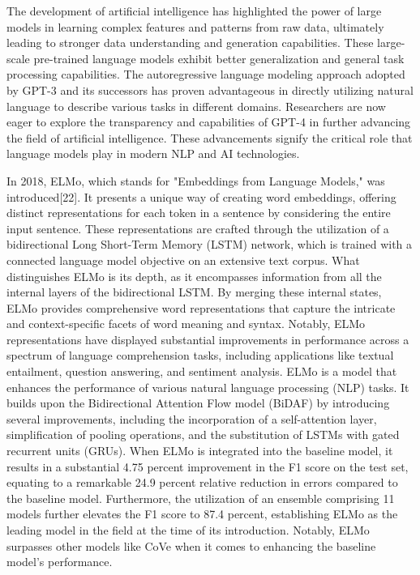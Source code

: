 \documentclass[conference]{IEEEtran}
\begin{document}
The development of artificial intelligence has highlighted the power of large models in learning complex features and patterns from raw data, ultimately leading to stronger data understanding and generation capabilities. These large-scale pre-trained language models exhibit better generalization and general task processing capabilities. The autoregressive language modeling approach adopted by GPT-3 and its successors has proven advantageous in directly utilizing natural language to describe various tasks in different domains. Researchers are now eager to explore the transparency and capabilities of GPT-4 in further advancing the field of artificial intelligence. These advancements signify the critical role that language models play in modern NLP and AI technologies.



In 2018, ELMo, which stands for "Embeddings from Language Models," was introduced[22]. It presents a unique way of creating word embeddings, offering distinct representations for each token in a sentence by considering the entire input sentence. These representations are crafted through the utilization of a bidirectional Long Short-Term Memory (LSTM) network, which is trained with a connected language model objective on an extensive text corpus. What distinguishes ELMo is its depth, as it encompasses information from all the internal layers of the bidirectional LSTM. By merging these internal states, ELMo provides comprehensive word representations that capture the intricate and context-specific facets of word meaning and syntax. Notably, ELMo representations have displayed substantial improvements in performance across a spectrum of language comprehension tasks, including applications like textual entailment, question answering, and sentiment analysis.
ELMo is a model that enhances the performance of various natural language processing (NLP) tasks. It builds upon the Bidirectional Attention Flow model (BiDAF) by introducing several improvements, including the incorporation of a self-attention layer, simplification of pooling operations, and the substitution of LSTMs with gated recurrent units (GRUs). When ELMo is integrated into the baseline model, it results in a substantial 4.75 percent improvement in the F1 score on the test set, equating to a remarkable 24.9 percent relative reduction in errors compared to the baseline model. Furthermore, the utilization of an ensemble comprising 11 models further elevates the F1 score to 87.4 percent, establishing ELMo as the leading model in the field at the time of its introduction. Notably, ELMo surpasses other models like CoVe when it comes to enhancing the baseline model's performance.
\end{document}
